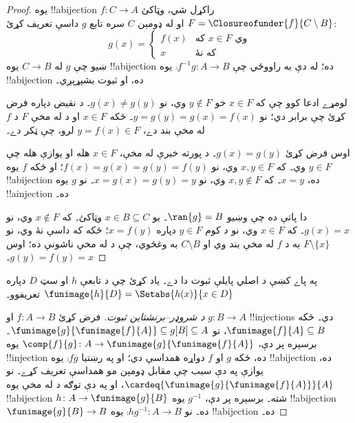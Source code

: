 \documentclass[../../../include/open-logic-section]{subfiles}
\begin{document}
\begin{proof}
يوه !!a{bijection} $f \colon C \to A$ راکړل شي، وټاکئ
$F = \Closureofunder{f}{C \setminus B}$ او له ډومېن $C$ سره تابع
$g$ داسې تعريف کړئ:
\[
	g(x) =
	\begin{cases}
			f(x) &\text{که $x \in F$ وي}\\
			x & \text{که نۀ}
	\end{cases}
\]
ښيو چې $g$ له $C \to B$ يوه !!a{bijection} ده؛ له دې به راووځي
چې $\comp{f^{-1}}{g} \colon A \to B$ يوه !!a{bijection} ده، او
ثبوت بشپړېږي۔

لومړے ادعا کوو چې که $x \in F$ خو $y\notin F$ وي، نو
$g(x) \neq g(y)$۔ د نقيض دپاره فرض کړئ چې برابر دي؛ نو
$y = g(y) = g(x) = f(x)$۔ ځکه $x \in F$ او د
 له مخې $F$ د $f$ له مخې بند دے،
$y = f(x) \in F$ لرو، چې ټکر دے۔

اوس فرض کړئ $g(x) = g(y)$۔ د پورته خبرې له مخې، $x \in F$ هله او
يوازې هله چې $y \in F$ وي۔ که $x, y \in F$ وي، نو
$f(x) = g (x) = g(y) = f(y)$؛ او ځکه $f$ يوه !!a{bijection} ده،
$x = y$۔ که $x, y \notin F$ وي، نو $x = g(x) = g(y) = y$۔ نو
$g$ يوه !!a{injection} ده۔

دا پاتې ده چې وښيو $\ran{g} = B$۔ يو $x \in B \subseteq C$
وټاکئ۔ که $x \notin F$ وي، نو $g(x) = x$۔ که $x \in F$ وي، نو د
کوم $y \in F$ دپاره $x = f(y)$؛ ځکه که داسې نۀ وي، نو
$F \setminus \{x\}$ به د $f$ له مخې بند وي او $C\setminus B$ به
وغځوي، چې د  له مخې ناشونې ده؛ اوس
$g(y) = f(y) = x$۔
\end{proof}

په پاے کښې د اصلي پايلې ثبوت دا دے۔ ياد کړئ چې د تابعې $h$ او سټ
$D$ دپاره $\funimage{h}{D} = \Setabs{h(x)}{x \in D}$ تعريفوو۔

\begin{proof}[د شروډر--برنشتاين ثبوت] فرض کړئ $f \colon A \to B$
او $g \colon B \to A$ !!{injection}s دي۔ ځکه
$\funimage{f}{A} \subseteq B$، نو
$\funimage{g}{\funimage{f}{A}} \subseteq g[B] \subseteq A$۔
برسېره پر دې، $\comp{f}{g} \colon A \to
\funimage{g}{\funimage{f}{A}}$ يوه !!{injection} ده، ځکه $g$ او
$f$ دواړه همداسې دي؛ او په رښتيا $\comp{f}{g}$ يوه
!!a{bijection} ده، يوازې په دې سبب چې مقابل ډومېن مو همداسې تعريف
کړے۔ نو $\cardeq{\funimage{g}{\funimage{f}{A}}}{A}$، او په دې توګه
د  له مخې يوه !!a{bijection} $h \colon A \to
\funimage{g}{B}$ شته۔ برسېره پر دې، $g^{-1}$ يوه !!a{bijection}
$\funimage{g}{B} \to B$ ده۔ نو $\comp{h}{g^{-1}} \colon A \to B$
يوه !!a{bijection} ده۔
\end{proof}
\end{document}
